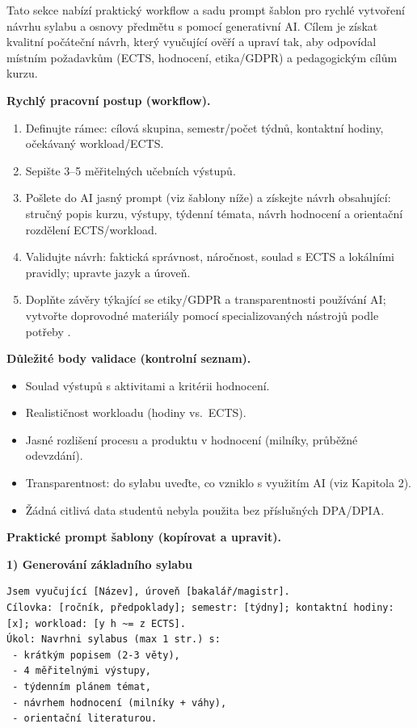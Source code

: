 Tato sekce nabízí praktický workflow a sadu prompt šablon pro rychlé vytvoření návrhu sylabu a osnovy předmětu s pomocí generativní AI. Cílem je získat kvalitní počáteční návrh, který vyučující ověří a upraví tak, aby odpovídal místním požadavkům (ECTS, hodnocení, etika/GDPR) a pedagogickým cílům kurzu.

\medskip
\textbf{Rychlý pracovní postup (workflow).}
\begin{enumerate}
  \item Definujte rámec: cílová skupina, semestr/počet týdnů, kontaktní hodiny, očekávaný workload/ECTS.
  \item Sepište 3--5 měřitelných učebních výstupů.
  \item Pošlete do AI jasný prompt (viz šablony níže) a získejte návrh obsahující: stručný popis kurzu, výstupy, týdenní témata, návrh hodnocení a orientační rozdělení ECTS/workload.
  \item Validujte návrh: faktická správnost, náročnost, soulad s ECTS a lokálními pravidly; upravte jazyk a úroveň.
  \item Doplňte závěry týkající se etiky/GDPR a transparentnosti používání AI; vytvořte doprovodné materiály pomocí specializovaných nástrojů podle potřeby \cite{kb_ai_101_tipu_pdf_04e4a115_page_44_2, kb_ai_101_tipu_pdf_04e4a115_page_51_1}.
\end{enumerate}

\medskip
\textbf{Důležité body validace (kontrolní seznam).}
\begin{itemize}
  \item Soulad výstupů s aktivitami a kritérii hodnocení.
  \item Realističnost workloadu (hodiny vs.\ ECTS).
  \item Jasné rozlišení procesu a produktu v hodnocení (milníky, průběžné odevzdání).
  \item Transparentnost: do sylabu uveďte, co vzniklo s využitím AI (viz Kapitola 2).
  \item Žádná citlivá data studentů nebyla použita bez příslušných DPA/DPIA.
\end{itemize}

\medskip
\textbf{Praktické prompt šablony (kopírovat a upravit).}

\textbf{1) Generování základního sylabu}
\begin{verbatim}
Jsem vyučující [Název], úroveň [bakalář/magistr].
Cílovka: [ročník, předpoklady]; semestr: [týdny]; kontaktní hodiny: [x]; workload: [y h ~= z ECTS].
Úkol: Navrhni sylabus (max 1 str.) s:
 - krátkým popisem (2-3 věty),
 - 4 měřitelnými výstupy,
 - týdenním plánem témat,
 - návrhem hodnocení (milníky + váhy),
 - orientační literaturou.
\end{verbatim}


